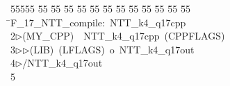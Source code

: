 %
%
\begin{tabbing}
55555 \= 55 \= 55 \= 55 \= 55 \= 55 \= 55 \= 55 \= 55 \= 55 \= 55 \= 55 \= 55 \= \>F\_17\_NTT\_compile:\ NTT\_k4\_q17cpp\\[0pt]
2\>$\triangleright$\>(MY\_CPP)\ \ NTT\_k4\_q17cpp\ (CPPFLAGS)\ \\[0pt]
3\>$\triangleright$\>$\triangleright$\>(LIB)\ (LFLAGS)\ o\ NTT\_k4\_q17out\\[0pt]
4\>$\triangleright$\>/NTT\_k4\_q17out\\[0pt]
5\>\end{tabbing}

